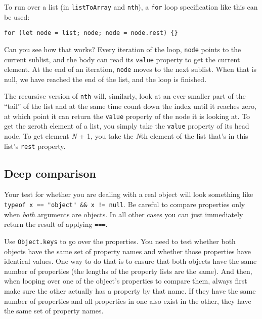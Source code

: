 To run over a list (in \lstinline`listToArray` and \lstinline`nth`), a \lstinline`for` loop specification like this can be used:

\begin{lstlisting}
for (let node = list; node; node = node.rest) {}
\end{lstlisting}
\noindent

Can you see how that works? Every iteration of the loop, \lstinline`node` points to the current sublist, and the body can read its \lstinline`value` property to get the current element. At the end of an iteration, \lstinline`node` moves to the next sublist. When that is null, we have reached the end of the list, and the loop is finished.

The recursive version of \lstinline`nth` will, similarly, look at an ever smaller part of the ``tail'' of the list and at the same time count down the index until it reaches zero, at which point it can return the \lstinline`value` property of the node it is looking at. To get the zeroth element of a list, you simply take the \lstinline`value` property of its head node. To get element \emph{N} + 1, you take the \emph{N}th element of the list that's in this list's \lstinline`rest` property.

\subsection{Deep comparison}

Your test for whether you are dealing with a real object will look something like \lstinline`typeof x == "object" && x != null`. Be careful to compare properties only when \emph{both} arguments are objects. In all other cases you can just immediately return the result of applying \lstinline`===`.

Use \lstinline`Object.keys` to go over the properties. You need to test whether both objects have the same set of property names and whether those properties have identical values. One way to do that is to ensure that both objects have the same number of properties (the lengths of the property lists are the same). And then, when looping over one of the object's properties to compare them, always first make sure the other actually has a property by that name. If they have the same number of properties and all properties in one also exist in the other, they have the same set of property names.

